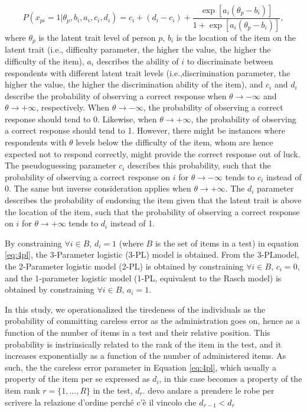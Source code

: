 \documentclass{svproc}
\begin{document}
\begin{equation}\label{eq:4pl}
	P(x_{pi}= 1| \theta_p, b_i, a_i, c_i, d_i) = c_i + (d_i -c_i) + \dfrac{\exp[a_i(\theta_p - b_i)]}{1 + \exp[a_i(\theta_p - b_i)]},
\end{equation}
where $\theta_p$ is the latent trait level of person $p$, $b_i$ is the location of the item on the latent trait (i.e., difficulty parameter, the higher the value, the higher the difficulty of the item), $a_i$ describes the ability of $i$ to discriminate between respondents with different latent trait levels (i.e.,discrimination parameter, the higher the value, the higher the discrimination ability of the item), and $c_i$ and $d_i$ describe the probability of observing a correct response when $\theta \to - \infty$ and $\theta \to +\infty$, respectively. 
When $\theta \to - \infty$, the probability of observing a correct response should tend to 0. Likewise, when $\theta \rightarrow +\infty$, the probability of observing a correct response should tend to 1. 
However, there might be instances where respondents with $\theta$ levels below the difficulty of the item, whom are hence expected not to respond correctly, might provide the correct response out of luck. The pseudoguessing parameter $c_i$ describes this probability, such that the probability of observing a correct response on $i$ for $\theta \to - \infty$ tends to $c_i$ instead of 0. 
The same but inverse consideration applies when $\theta \to + \infty$. The $d_i$ parameter describes the probability of endorsing the item given that the latent trait is above the location of the item, such that the probability of observing a correct response on $i$ for $\theta \to + \infty$ tends to $d_i$ instead of 1. 

By constraining $\forall i \in B, \, d_i = 1$ (where $B$ is the set of items in a test) in equation \ref{eq:4pl}, the 3-Parameter logistic (3-PL) model is obtained. From the 3-PLmodel, the 2-Parameter logistic model (2-PL) is obtained by constraining $\forall i \in B, \, c_i = 0$, and the 1-parameter logistic model (1-PL, equivalent to the Rasch model) is obtained by constraining $\forall i \in B, \, a_i = 1$. 

\color{blue}
In this study, we operationalized the tiredeness of the individuals as the probability of committing careless error as the administration goes on, hence as a function of the number of items in a test and their relative position. 
This probability is instrinsically related to the rank of the item in the test, and it increases exponentially as a function of the number of administered items. As such, the  the careless error parameter in Equation \ref{eq:4pl}, which usually a property of the item per se expressed as $d_i$, in this case becomes a property of the item rank $r = \{1, \ldots, R\}$ in the test, $d_r$. 
\color{red}
devo andare a prendere le robe per scrivere la relazione d'ordine perché c'è il vincolo che $d_{r-1} < d_r$
\normalcolor
\end{document}
